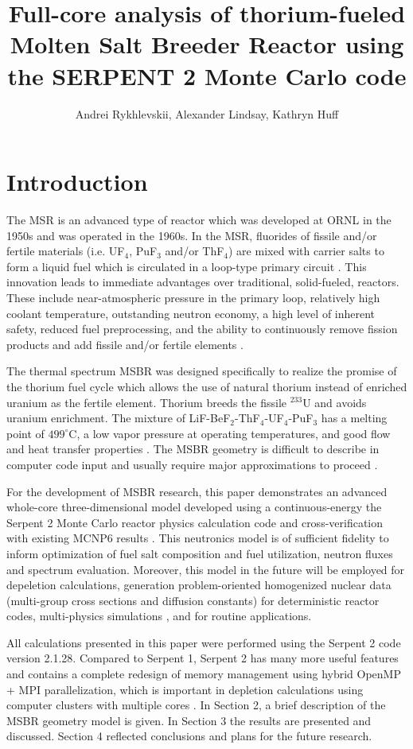 \documentclass{anstrans}
\title{Full-core analysis of thorium-fueled Molten Salt Breeder Reactor using the SERPENT 2 Monte Carlo code}
\author{Andrei Rykhlevskii, Alexander Lindsay, Kathryn Huff}
\institute{
Department of Nuclear, Plasma, and Radiological Engineering, University of Illinois at Urbana-Champaign \break
Urbana, IL
}
\begin{document}
\section{Introduction}
The \gls{MSR} is an advanced type of reactor which was developed at \gls{ORNL} in the 1950s and was operated in the 1960s. In the MSR, fluorides of fissile and/or fertile materials (i.e. UF$_4$, PuF$_3$ and/or ThF$_4$) are mixed with carrier salts to form a liquid fuel which is circulated in a loop-type primary circuit \cite{haubenreich_experience_1970}. This innovation leads to immediate advantages over traditional, solid-fueled, reactors. These include near-atmospheric pressure in the primary loop, relatively high coolant temperature, outstanding neutron economy, a high level of inherent safety, reduced fuel preprocessing, and the ability to continuously remove fission products and add fissile and/or fertile elements \cite{leblanc_molten_2010}. 

The thermal spectrum \gls{MSBR} was designed specifically to realize the promise of the thorium fuel cycle which allows the use of natural thorium instead of enriched uranium as the fertile element. Thorium breeds the fissile $^{233}$U and avoids uranium enrichment. The mixture of LiF-BeF$_2$-ThF$_4$-UF$_4$-PuF$_3$ has a melting point of $499^\circ$C, a low vapor pressure at operating temperatures, and good flow and heat transfer properties \cite{robertson_conceptual_1971}. The \gls{MSBR} geometry is difficult to describe in computer code input and usually require major approximations to proceed \cite{park_whole_2015}. 

For the development of MSBR research, this paper demonstrates an advanced whole-core three-dimensional model developed using a continuous-energy the Serpent 2 Monte Carlo reactor physics calculation code and cross-verification with existing MCNP6 results \cite{park_whole_2015,leppanen_serpent_2012}. This neutronics model is of sufficient fidelity to inform optimization of fuel salt composition and fuel utilization, neutron fluxes and spectrum evaluation. Moreover, this model in the future will be employed for depeletion calculations, generation problem-oriented homogenized nuclear data (multi-group cross sections and diffusion constants) for deterministic reactor codes, multi-physics simulations \cite{fridman_use_2011,valtavirta_coupled_2017}, and for routine applications.

All calculations presented in this paper were performed using the Serpent 2 code version 2.1.28. Compared to Serpent 1, Serpent 2 has many more useful features and contains a complete redesign of memory management using hybrid OpenMP + MPI parallelization, which is important in depletion calculations using computer clusters with multiple cores \cite{leppanen_serpent_2015}. In Section 2, a brief description of the MSBR geometry model is given. In Section 3 the results are presented and discussed. Section 4 reflected conclusions and plans for the future research.
\end{document}
